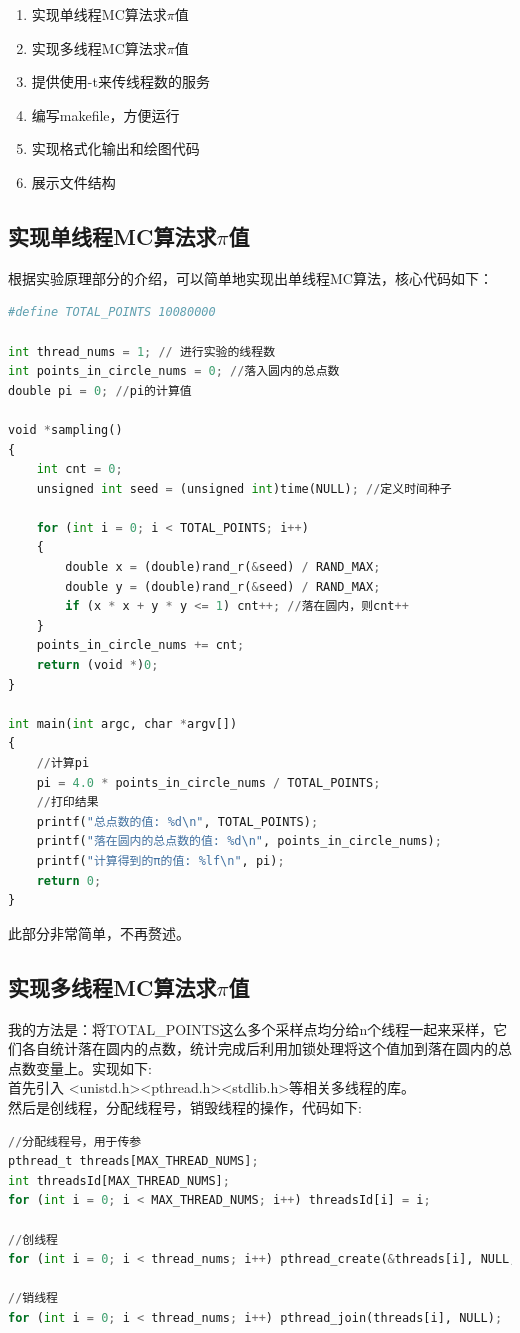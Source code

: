 \documentclass{LabReport}
\begin{document}
	\begin{enumerate}
		\item 实现单线程MC算法求$\pi$值
		\item 实现多线程MC算法求$\pi$值
		\item 提供使用-t来传线程数的服务
		\item 编写makefile，方便运行
		\item 实现格式化输出和绘图代码
		\item 展示文件结构
	\end{enumerate}
	
	\subsection{实现单线程MC算法求$\pi$值}
	根据实验原理部分的介绍，可以简单地实现出单线程MC算法，核心代码如下：
\begin{lstlisting}[language=python,frame=shadowbox]
#define TOTAL_POINTS 10080000

int thread_nums = 1; // 进行实验的线程数
int points_in_circle_nums = 0; //落入圆内的总点数
double pi = 0; //pi的计算值

void *sampling()
{
	int cnt = 0;
	unsigned int seed = (unsigned int)time(NULL); //定义时间种子
	
	for (int i = 0; i < TOTAL_POINTS; i++)
	{
		double x = (double)rand_r(&seed) / RAND_MAX;
		double y = (double)rand_r(&seed) / RAND_MAX;
		if (x * x + y * y <= 1) cnt++; //落在圆内，则cnt++
	}
	points_in_circle_nums += cnt;
	return (void *)0;
}

int main(int argc, char *argv[])
{
	//计算pi
	pi = 4.0 * points_in_circle_nums / TOTAL_POINTS;
	//打印结果
	printf("总点数的值: %d\n", TOTAL_POINTS);
	printf("落在圆内的总点数的值: %d\n", points_in_circle_nums);
	printf("计算得到的π的值: %lf\n", pi);
	return 0;
}
\end{lstlisting}
	此部分非常简单，不再赘述。
	
	\subsection{实现多线程MC算法求$\pi$值}
	我的方法是：将TOTAL\_POINTS这么多个采样点均分给n个线程一起来采样，它们各自统计落在圆内的点数，统计完成后利用加锁处理将这个值加到落在圆内的总点数变量上。实现如下:\\
	首先引入 <unistd.h><pthread.h><stdlib.h>等相关多线程的库。\\
	然后是创线程，分配线程号，销毁线程的操作，代码如下:
	
	\begin{lstlisting}[language=python,frame=shadowbox]
//分配线程号，用于传参
pthread_t threads[MAX_THREAD_NUMS];
int threadsId[MAX_THREAD_NUMS];
for (int i = 0; i < MAX_THREAD_NUMS; i++) threadsId[i] = i;

//创线程
for (int i = 0; i < thread_nums; i++) pthread_create(&threads[i], NULL, sampling, &threadsId[i]);

//销线程
for (int i = 0; i < thread_nums; i++) pthread_join(threads[i], NULL);
	\end{lstlisting}
	
\end{document}
